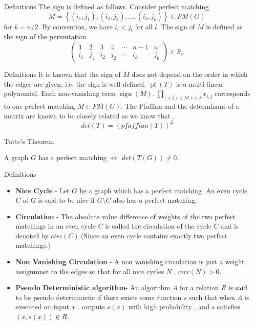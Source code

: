 \documentclass{beamer}
\begin{document}
	\begin{frame}{Definitions}
		The sign is defined as follows. Consider perfect matching
		$$
		M=\left\{\left(i_1, j_1\right),\left(i_2, j_2\right), \ldots,\left(i_k, j_k\right)\right\} \in P M(G)
		$$
		for $k=n / 2$. By convention, we have $i_l<j_l$ for all $l$. The sign of $M$ is defined as the sign of the permutation
		\begin{equation}
			\left(\begin{array}{ccccccc}
				1 & 2 & 3 & 4 & \cdots & n-1 & n \\
				i_1 & j_1 & i_2 & j_2 & \cdots & i_k & j_k
			\end{array}\right) \in S_n
		\end{equation}
	\end{frame}
	\begin{frame}{Definitions}
		It is known that the sign of $M$ does not depend on the order in which the edges are given, i.e. the sign is well defined.
		$\operatorname{pf}(T)$ is a multi-linear polynomial. Each non-vanishing term $\operatorname{sign}(M)$. $\prod_{(i,j)\in M,i<j} x_{i, j}$ corresponds to one perfect matching $M \in P M(G)$. The Pfaffian 
		and the determinant of a matrix are known to be closely related as we know that .
			$$det(T)=(pfaffian(T))^2$$
			
	\end{frame}
	\begin{frame}{Tutte's Theorem}
		\begin{theorem}
			A graph $G$ has a perfect matching $\iff$ $det(T(G)) \neq 0$.
		\end{theorem}
		
		 
		
	\end{frame}
	\begin{frame}[allowframebreaks]{Definitions}
		\begin{itemize}
			\item\textbf{Nice Cycle} - Let $G$ be a graph which has a perfect matching .An even cycle $C$ of $G$ is said to be nice if $G \setminus C$ also has a perfect matching.
			\item\textbf{Circulation} - The absolute value difference of weights of the two perfect matchings in an even cycle $C$ is called the circulation of the cycle $C$ and is denoted by $circ(C)$.(Since an even cycle contains exactly two perfect matchings.)
			\item \textbf{Non Vanishing Circulation} - A non vanishing circulation is just a weight assignmnet to the edges so that for all nice cycles $N$ , $circ(N)>0$.
			\item \textbf{Pseudo Deterministic algorithm}- An algorithm $A$ for a relation $R$ is said to be pseudo deterministic if there exists some function $s$ such that when $A$ is executed on input $x$ , outputs $s(x)$ with high probability , and $s$ satisfies $(x,s(x))\in R$.
			
		\end{itemize}
		
		
	\end{frame}
\end{document}
